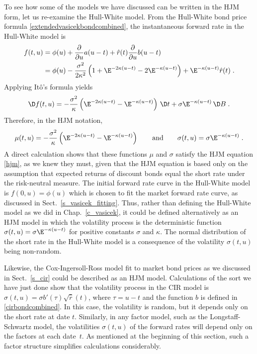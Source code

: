 To see how some of the models we have discussed can be written in the HJM form, let us re-examine the Hull-White model.  From the Hull-White bond price formula \eqref{extendedvasicekbondcombined},  the instantaneous forward rate in the Hull-White model is
\begin{align*}
f(t,u) & = \phi(u)  + \frac{\partial}{\partial u} a(u-t) + \hat{r}(t)\frac{\partial}{\partial u} b(u-t)\\
&= \phi(u) -\frac{\sigma^2}{2\kappa^2}\left(1 + \E^{-2\kappa(u-t)} -2 \E^{-\kappa(u-t)}\right) + \E^{-\kappa(u-t)}\hat{r}(t)\;.
\end{align*}
Applying It\^o's formula yields
$$\D f(t,u) = -\frac{\sigma^2}{\kappa}\left(\E^{-2\kappa(u-t)}-\E^{-\kappa(u-t)}\right)\,\D t + \sigma \E^{-\kappa(u-t)}\,\D B\; .$$
Therefore, in the HJM notation,
$$\mu(t,u) = -\frac{\sigma^2}{\kappa}\left(\E^{-2\kappa(u-t)}-\E^{-\kappa(u-t)}\right) \qquad \text{and} \qquad \sigma(t,u) =  \sigma \E^{-\kappa(u-t)}\; .$$
A direct calculation shows that these functions $\mu$ and $\sigma$ satisfy the HJM equation \eqref{hjm}, as we knew they must, given that the HJM equation is based only on the assumption that expected returns of discount bonds equal the short rate under the risk-neutral measure.  The initial forward rate curve in the Hull-White model is $f(0,u) = \phi(u)$ which is chosen to fit the market forward rate curve, as discussed in Sect.~\ref{s_vasicek_fitting}.  Thus, rather than defining the Hull-White model as we did in Chap.~\ref{c_vasicek}, it could be defined alternatively as an HJM model in which the volatility process is the deterministic function $\sigma(t,u) = \sigma \E^{-\kappa(u-t)}$ for positive constants $\sigma$ and $\kappa$.  The normal distribution of the short rate in the Hull-White model is a consequence of the volatility $\sigma(t,u)$ being non-random.

Likewise, the Cox-Ingersoll-Ross model fit to market bond prices as we discussed in Sect.~\ref{s_cir} could be described as an HJM model.  Calculations of the sort we have just done show that the volatility process in the CIR model is $\sigma(t,u) = \sigma b'(\tau)\sqrt{\hat{r}}(t)$, where $\tau = u-t$ and the function $b$ is defined in \eqref{cirbondcombined}.  In this case, the volatility is random, but it depends only on the short rate at date $t$.  Similarly, in any factor model, such as the Longstaff-Schwartz model, the volatilities $\sigma(t,u)$ of the forward rates will depend only on the factors at each date~$t$.  As mentioned at the beginning of this section, such a factor structure simplifies calculations considerably.

